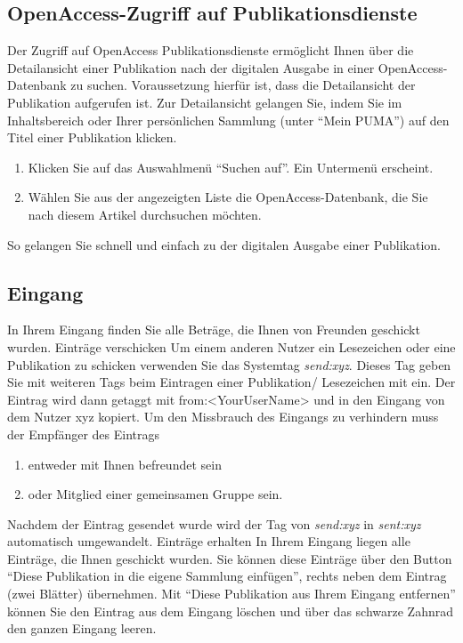 \documentclass[a4paper,11pt,twoside]{scrbook}
\begin{document}
\subsection{OpenAccess-Zugriff auf Publikationsdienste}%
Der Zugriff auf OpenAccess Publikationsdienste ermöglicht Ihnen über die Detailansicht einer Publikation nach der digitalen Ausgabe in einer OpenAccess-Datenbank zu suchen. Voraussetzung hierfür ist, dass die Detailansicht der Publikation aufgerufen ist. Zur Detailansicht gelangen Sie, indem Sie im Inhaltsbereich oder Ihrer persönlichen Sammlung (unter \enquote{Mein PUMA}) auf den Titel einer Publikation klicken. 
\begin{enumerate}
    \item Klicken Sie auf das Auswahlmenü \enquote{Suchen auf}. Ein Untermenü erscheint.
    \item Wählen Sie aus der angezeigten Liste die OpenAccess-Datenbank, die Sie nach diesem Artikel durchsuchen möchten. 
\end{enumerate}
 So gelangen Sie schnell und einfach zu der digitalen Ausgabe einer Publikation. 
\subsection{Eingang}
In Ihrem Eingang finden Sie alle Beträge, die Ihnen von Freunden geschickt wurden.
\newline
\newline
Einträge verschicken
\newline
Um einem anderen Nutzer ein Lesezeichen oder eine Publikation zu schicken verwenden Sie das Systemtag \textit{send:xyz}. Dieses Tag geben Sie mit weiteren Tags beim Eintragen einer Publikation/ Lesezeichen mit ein. Der Eintrag wird dann getaggt mit from:<YourUserName> und in den Eingang von dem Nutzer xyz kopiert. Um den Missbrauch des Eingangs zu verhindern muss der Empfänger des Eintrags
\begin{enumerate}
    \item entweder mit Ihnen befreundet sein
    \item oder Mitglied einer gemeinsamen Gruppe sein.
\end{enumerate}
Nachdem der Eintrag gesendet wurde wird der Tag von \textit{send:xyz} in \textit{sent:xyz} automatisch umgewandelt.
\newline
\newline
Einträge erhalten
\newline
In Ihrem Eingang liegen alle Einträge, die Ihnen geschickt wurden. Sie können diese Einträge über den Button \enquote{Diese Publikation in die eigene Sammlung einfügen}, rechts neben dem Eintrag (zwei Blätter) übernehmen. Mit \enquote{Diese Publikation aus Ihrem Eingang entfernen} können Sie den Eintrag aus dem Eingang löschen und über das schwarze Zahnrad den ganzen Eingang leeren.
\newpage
\end{document}
